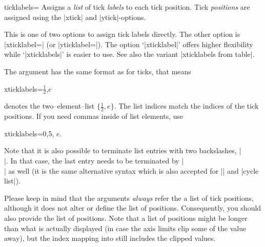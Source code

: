 \begin{pgfplotsxykey}{\x ticklabels=}
\label{pgfplots:key:xticklabels}%
Assigns a \emph{list} of tick \emph{labels} to each tick position. Tick \emph{positions} are assigned using the |xtick| and |ytick|-options.

This is one of two options to assign tick labels directly. The other option is |xticklabel=| (or |yticklabel=|).
The option `|xticklabel|' offers higher flexibility while `|xticklabels|' is easier to use. See also the variant |xticklabels from table|.

The argument  has the same format as for ticks, that means
\begin{codeexample}
xticklabels={$\frac{1}{2}$,$e$}
\end{codeexample}
denotes the two--element--list $\{\frac 12, e\}$. The list indices match the indices of the tick positions. If you need commas inside of list elements, use 
\begin{codeexample}
xticklabels={{0,5}, $e$}.
\end{codeexample}


\begin{codeexample}[]
\end{codeexample}

\begin{codeexample}[]
\end{codeexample}

	Note that it is also possible to terminate list entries with two backslashes, |\\|. In that case, the last entry needs to be terminated by |\\| as well (it is the same alternative syntax which is also accepted for |\legend| and |cycle list|).

	Please keep in mind that the arguments \emph{always} refer the a list of tick positions, although it does not alter or define the list of positions. Consequently, you should also provide the list of positions. Note that a list of positions might be longer than what is actually displayed (in case the axis limits clip some of the value away), but the index mapping into  still includes the clipped values.
\end{pgfplotsxykey}


